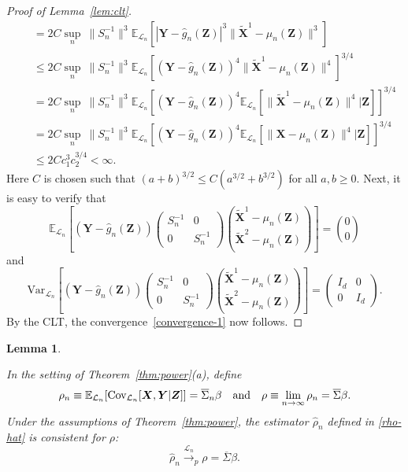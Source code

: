 \documentclass[12pt]{article}
\newtheorem{lemma}{Lemma}
\theoremstyle{definition}
\theoremstyle{remark}
\newcommand{\prx}{\bm X}
\newcommand{\prz}{\bm Z}
\newcommand{\prxk}{{{\widetilde{\bm X}}}}
\newcommand{\pry}{{\bm Y}}
\begin{document}
\begin{proof}[Proof of Lemma~\ref{lem:clt}]
\begin{equation}
\begin{split}
			&\quad = 2C\sup_{n}\ \|S_n^{-1}\|^3 \mathbb E_{\mathcal L_n}\left[|\pry- \widehat g_n(\prz)|^3\|\prxk^1 - \mu_n(\prz)\|^3\right] \\
			&\quad \leq 2C\sup_{n}\ \|S_n^{-1}\|^3 \mathbb E_{\mathcal L_n}\left[(\pry- \widehat g_n(\prz))^4\|\prxk^1 - \mu_n(\prz)\|^4\right]^{3/4} \\
			&\quad = 2C\sup_{n}\ \|S_n^{-1}\|^3 \mathbb E_{\mathcal L_n}\left[(\pry- \widehat g_n(\prz))^4\mathbb E_{\mathcal L_n}[\|\prxk^1 - \mu_n(\prz)\|^4|\prz]\right]^{3/4} \\
			&\quad = 2C\sup_{n}\ \|S_n^{-1}\|^3 \mathbb E_{\mathcal L_n}\left[(\pry- \widehat g_n(\prz))^4\mathbb E_{\mathcal L_n}[\|\prx - \mu_n(\prz)\|^4|\prz]\right]^{3/4} \\
			&\quad \leq 2C c_1^3 c_2^{3/4} < \infty.
		\end{split}
	\end{equation}
	Here $C$ is chosen such that $(a+b)^{3/2} \leq C(a^{3/2} + b^{3/2})$ for all $a,b \geq 0$.
	Next, it is easy to verify that
	\begin{equation}
		\mathbb E_{\mathcal L_n}\left[(\pry - \widehat g_n(\prz))\begin{pmatrix}
			S_n^{-1} & 0 \\
			0 & S_n^{-1}
		\end{pmatrix}{\prxk^1 - \mu_n(\prz) \choose \prxk^2 - \mu_n(\prz)}\right] = {0 \choose 0}
	\end{equation}
	and
	\begin{equation}
		\text{Var}_{\mathcal L_n}\left[(\pry - \widehat g_n(\prz))\begin{pmatrix}
			S_n^{-1} & 0 \\
			0 & S_n^{-1}
		\end{pmatrix}{\prxk^1 - \mu_n(\prz) \choose \prxk^2 - \mu_n(\prz)}\right] = \begin{pmatrix}
			I_d & 0 \\
			0 & I_d
		\end{pmatrix}.
	\end{equation}
	By the CLT, the convergence~\eqref{convergence-1} now follows.
\end{proof}

\begin{lemma} \label{lem:consistency}

In the setting of Theorem~\ref{thm:power}(a), define 
\begin{equation*}
\rho_n \equiv \mathbb E_{\mathcal L_n}[\textnormal{Cov}_{\mathcal L_n}[\prx,\pry|\prz]] = \overline \Sigma_n \beta \quad \text{and} \quad \rho \equiv \lim_{n \rightarrow \infty} \rho_n = \overline \Sigma \beta.
\end{equation*}
Under the assumptions of Theorem~\ref{thm:power}, the estimator $\widehat \rho_n$ defined in \eqref{rho-hat} is consistent for $\rho$:
	\begin{equation}
	\widehat \rho_n \overset{\mathcal L_n}\rightarrow _p \rho = \overline \Sigma \beta.
	\label{eq:estimation-consistency}
\end{equation}

\end{lemma}
\end{document}

